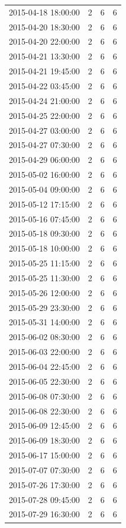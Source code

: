 \begin{tabular}{lrrr}
2015-04-18 18:00:00 & 2 & 6 & 6 \\
2015-04-20 18:30:00 & 2 & 6 & 6 \\
2015-04-20 22:00:00 & 2 & 6 & 6 \\
2015-04-21 13:30:00 & 2 & 6 & 6 \\
2015-04-21 19:45:00 & 2 & 6 & 6 \\
2015-04-22 03:45:00 & 2 & 6 & 6 \\
2015-04-24 21:00:00 & 2 & 6 & 6 \\
2015-04-25 22:00:00 & 2 & 6 & 6 \\
2015-04-27 03:00:00 & 2 & 6 & 6 \\
2015-04-27 07:30:00 & 2 & 6 & 6 \\
2015-04-29 06:00:00 & 2 & 6 & 6 \\
2015-05-02 16:00:00 & 2 & 6 & 6 \\
2015-05-04 09:00:00 & 2 & 6 & 6 \\
2015-05-12 17:15:00 & 2 & 6 & 6 \\
2015-05-16 07:45:00 & 2 & 6 & 6 \\
2015-05-18 09:30:00 & 2 & 6 & 6 \\
2015-05-18 10:00:00 & 2 & 6 & 6 \\
2015-05-25 11:15:00 & 2 & 6 & 6 \\
2015-05-25 11:30:00 & 2 & 6 & 6 \\
2015-05-26 12:00:00 & 2 & 6 & 6 \\
2015-05-29 23:30:00 & 2 & 6 & 6 \\
2015-05-31 14:00:00 & 2 & 6 & 6 \\
2015-06-02 08:30:00 & 2 & 6 & 6 \\
2015-06-03 22:00:00 & 2 & 6 & 6 \\
2015-06-04 22:45:00 & 2 & 6 & 6 \\
2015-06-05 22:30:00 & 2 & 6 & 6 \\
2015-06-08 07:30:00 & 2 & 6 & 6 \\
2015-06-08 22:30:00 & 2 & 6 & 6 \\
2015-06-09 12:45:00 & 2 & 6 & 6 \\
2015-06-09 18:30:00 & 2 & 6 & 6 \\
2015-06-17 15:00:00 & 2 & 6 & 6 \\
2015-07-07 07:30:00 & 2 & 6 & 6 \\
2015-07-26 17:30:00 & 2 & 6 & 6 \\
2015-07-28 09:45:00 & 2 & 6 & 6 \\
2015-07-29 16:30:00 & 2 & 6 & 6 \\

\end{tabular}
